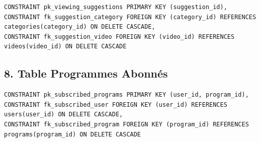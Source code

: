 \documentclass[a4paper, 12pt]{article}
\begin{document}
\begin{lstlisting}
CONSTRAINT pk_viewing_suggestions PRIMARY KEY (suggestion_id),
CONSTRAINT fk_suggestion_category FOREIGN KEY (category_id) REFERENCES categories(category_id) ON DELETE CASCADE,
CONSTRAINT fk_suggestion_video FOREIGN KEY (video_id) REFERENCES videos(video_id) ON DELETE CASCADE
\end{lstlisting}

\subsection*{8. Table Programmes Abonnés}

\begin{lstlisting}
CONSTRAINT pk_subscribed_programs PRIMARY KEY (user_id, program_id),
CONSTRAINT fk_subscribed_user FOREIGN KEY (user_id) REFERENCES users(user_id) ON DELETE CASCADE,
CONSTRAINT fk_subscribed_program FOREIGN KEY (program_id) REFERENCES programs(program_id) ON DELETE CASCADE
\end{lstlisting}
\end{document}
